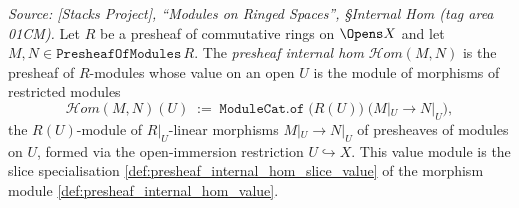 \begin{definition}\leanok
  \label{def:presheaf_internal_hom}
  \textit{Source: [Stacks Project], ``Modules on Ringed Spaces'', \S Internal Hom
  (tag area 01CM).}
  Let \(R\) be a presheaf of commutative rings on \(\Opens X\) and let
  \(M, N \in \mathtt{PresheafOfModules}\,R\). The \emph{presheaf internal hom}
  \(\mathcal{H}om(M, N)\) is the presheaf of \(R\)-modules whose value on an open
  \(U\) is the module of morphisms of restricted modules
  \[
    \mathcal{H}om(M, N)(U)
      \;:=\;
    \mathtt{ModuleCat.of}\;\bigl(R(U)\bigr)\;\bigl(M|_U \longrightarrow N|_U\bigr),
  \]
  the \(R(U)\)-module of \(R|_U\)-linear morphisms \(M|_U \to N|_U\) of presheaves of
  modules on \(U\), formed via the open-immersion restriction \(U \hookrightarrow X\).
  This value module is the slice specialisation
  \cref{def:presheaf_internal_hom_slice_value} of the morphism module
  \cref{def:presheaf_internal_hom_value}.


\end{definition}
